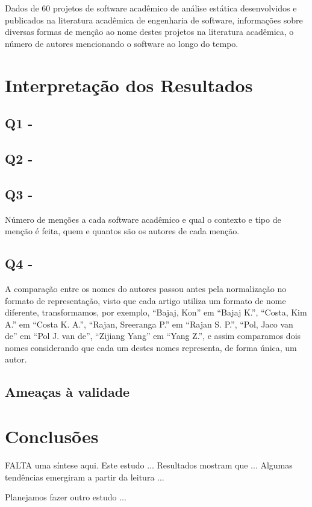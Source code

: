 Dados de 60 projetos de software acadêmico de análise estática desenvolvidos e
publicados na literatura acadêmica de engenharia de software, informações sobre
diversas formas de menção ao nome destes projetos na literatura acadêmica,
o número de autores mencionando o software ao longo do tempo.

\section{Interpretação dos Resultados} %

\subsection{Q1 - \EstudoDoisQuestaoUm}


\subsection{Q2 - \EstudoDoisQuestaoDois}


\subsection{Q3 - \EstudoDoisQuestaoTres}

Número de menções a cada software acadêmico e qual o contexto e tipo de menção
é feita, quem e quantos são os autores de cada menção.

\subsection{Q4 - \EstudoDoisQuestaoQuatro}

A comparação entre os nomes do autores passou antes pela normalização
no formato de representação, visto que cada artigo utiliza um formato
de nome diferente, transformamos, por exemplo, ``Bajaj, Kon'' em ``Bajaj K.'',
``Costa, Kim A.'' em ``Costa K. A.'', ``Rajan, Sreeranga P.'' em ``Rajan S. P.'',
``Pol, Jaco van de'' em ``Pol J. van de'', ``Zijiang Yang'' em ``Yang Z.'',
e assim comparamos dois nomes considerando que cada um destes nomes representa,
de forma única, um autor.

\subsection{Ameaças à validade}

\section{Conclusões}

FALTA uma síntese aqui. 
Este estudo ...
Resultados mostram que ...
Algumas tendências emergiram a partir da leitura ...

Planejamos fazer outro estudo ... 


